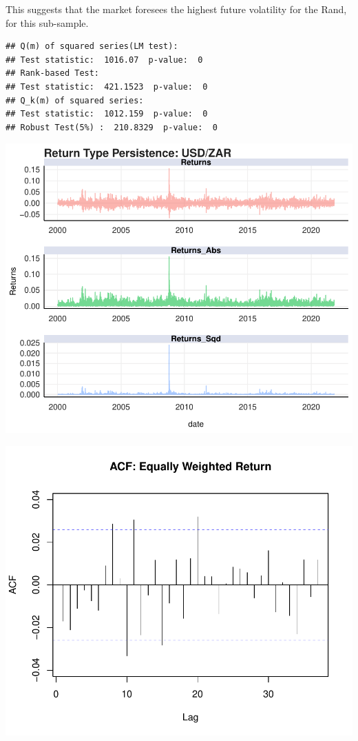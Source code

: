 \documentclass[11pt,preprint, authoryear]{elsarticle}
\numberwithin{equation}{section}
\numberwithin{figure}{section}
\numberwithin{table}{section}
\begin{document}
This suggests that the market foresees the highest future volatility for
the Rand, for this sub-sample.

\begin{verbatim}
## Q(m) of squared series(LM test):  
## Test statistic:  1016.07  p-value:  0 
## Rank-based Test:  
## Test statistic:  421.1523  p-value:  0 
## Q_k(m) of squared series:  
## Test statistic:  1012.159  p-value:  0 
## Robust Test(5%) :  210.8329  p-value:  0
\end{verbatim}

\includegraphics{Question5_files/figure-latex/unnamed-chunk-5-1.pdf}

\includegraphics{Question5_files/figure-latex/unnamed-chunk-6-1.pdf}
\end{document}
